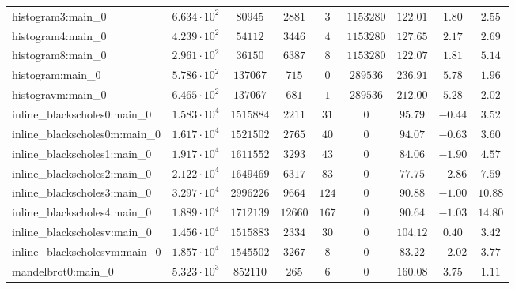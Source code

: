 \begin{tabular}{|l|c|c|c|c|c|c|c|c|}
histogram3:main\_0             & $ 6.634 \cdot 10^{2} $ & $ 80945    $ & $ 2881   $ & $ 3    $ & $ 1153280  $ & $ 122.01      $ & $ 1.80    $ & $ 2.55    $ \\
histogram4:main\_0             & $ 4.239 \cdot 10^{2} $ & $ 54112    $ & $ 3446   $ & $ 4    $ & $ 1153280  $ & $ 127.65      $ & $ 2.17    $ & $ 2.69    $ \\
histogram8:main\_0             & $ 2.961 \cdot 10^{2} $ & $ 36150    $ & $ 6387   $ & $ 8    $ & $ 1153280  $ & $ 122.07      $ & $ 1.81    $ & $ 5.14    $ \\
histogram:main\_0              & $ 5.786 \cdot 10^{2} $ & $ 137067   $ & $ 715    $ & $ 0    $ & $ 289536   $ & $ 236.91      $ & $ 5.78    $ & $ 1.96    $ \\
histogravm:main\_0             & $ 6.465 \cdot 10^{2} $ & $ 137067   $ & $ 681    $ & $ 1    $ & $ 289536   $ & $ 212.00      $ & $ 5.28    $ & $ 2.02    $ \\
inline\_blackscholes0:main\_0  & $ 1.583 \cdot 10^{4} $ & $ 1515884  $ & $ 2211   $ & $ 31   $ & $ 0        $ & $ 95.79       $ & $ -0.44   $ & $ 3.52    $ \\
inline\_blackscholes0m:main\_0 & $ 1.617 \cdot 10^{4} $ & $ 1521502  $ & $ 2765   $ & $ 40   $ & $ 0        $ & $ 94.07       $ & $ -0.63   $ & $ 3.60    $ \\
inline\_blackscholes1:main\_0  & $ 1.917 \cdot 10^{4} $ & $ 1611552  $ & $ 3293   $ & $ 43   $ & $ 0        $ & $ 84.06       $ & $ -1.90   $ & $ 4.57    $ \\
inline\_blackscholes2:main\_0  & $ 2.122 \cdot 10^{4} $ & $ 1649469  $ & $ 6317   $ & $ 83   $ & $ 0        $ & $ 77.75       $ & $ -2.86   $ & $ 7.59    $ \\
inline\_blackscholes3:main\_0  & $ 3.297 \cdot 10^{4} $ & $ 2996226  $ & $ 9664   $ & $ 124  $ & $ 0        $ & $ 90.88       $ & $ -1.00   $ & $ 10.88   $ \\
inline\_blackscholes4:main\_0  & $ 1.889 \cdot 10^{4} $ & $ 1712139  $ & $ 12660  $ & $ 167  $ & $ 0        $ & $ 90.64       $ & $ -1.03   $ & $ 14.80   $ \\
inline\_blackscholesv:main\_0  & $ 1.456 \cdot 10^{4} $ & $ 1515883  $ & $ 2334   $ & $ 30   $ & $ 0        $ & $ 104.12      $ & $ 0.40    $ & $ 3.42    $ \\
inline\_blackscholesvm:main\_0 & $ 1.857 \cdot 10^{4} $ & $ 1545502  $ & $ 3267   $ & $ 8    $ & $ 0        $ & $ 83.22       $ & $ -2.02   $ & $ 3.77    $ \\
mandelbrot0:main\_0            & $ 5.323 \cdot 10^{3} $ & $ 852110   $ & $ 265    $ & $ 6    $ & $ 0        $ & $ 160.08      $ & $ 3.75    $ & $ 1.11    $ \\

\end{tabular}
